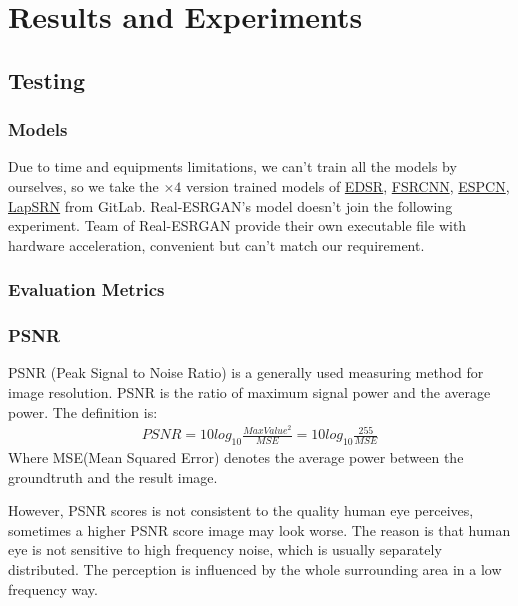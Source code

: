 \documentclass{article}
\begin{document}
  \section{Results and Experiments}
  \subsection{Testing}
  \subsubsection*{Models}
  Due to time and equipments limitations, we can't train all the models by ourselves, so
  we take the $\times 4$ version trained models of 
  \href{https://github.com/Saafke/EDSR_Tensorflow/tree/master/models}{EDSR},
  \href{https://github.com/Saafke/FSRCNN_Tensorflow/tree/master/models}{FSRCNN},
  \href{https://github.com/fannymonori/TF-ESPCN/tree/master/export}{ESPCN},
  \href{https://github.com/fannymonori/TF-LapSRN/tree/master/export}{LapSRN} from GitLab.
  Real-ESRGAN's model doesn't join the following experiment. 
  Team of Real-ESRGAN provide their own executable file with hardware acceleration, convenient but can't match our requirement.
  
  \subsubsection*{Evaluation Metrics}

    \subsubsection{PSNR}    
      PSNR (Peak Signal to Noise Ratio) is a generally used measuring method for image resolution.
      PSNR is the ratio of maximum signal power and the average power.
      The definition is:
      \begin{align*}
          PSNR = 10log_{10}\frac{MaxValue^2}{MSE} = 10log_{10}\frac{255}{MSE}
      \end{align*}
      Where MSE(Mean Squared Error) denotes the average power between the groundtruth and the result image.
  
      However, PSNR scores is not consistent to the quality human eye perceives, sometimes a higher PSNR score image may look worse.
      The reason is that human eye is not sensitive to high frequency noise, which is usually separately distributed. 
      The perception is influenced by the whole surrounding area in a low frequency way.
  
\end{document}
